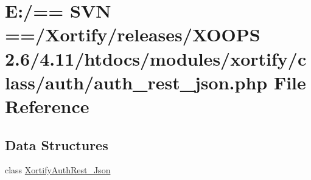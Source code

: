 \hypertarget{auth__rest__json_8php}{\section{E\-:/== S\-V\-N ==/\-Xortify/releases/\-X\-O\-O\-P\-S 2.6/4.11/htdocs/modules/xortify/class/auth/auth\-\_\-rest\-\_\-json.php File Reference}
\label{auth__rest__json_8php}
}
\subsection*{Data Structures}
\begin{DoxyCompactItemize}
\item 
class \hyperlink{class_xortify_auth_rest___json}{Xortify\-Auth\-Rest\-\_\-\-Json}
\end{DoxyCompactItemize}
